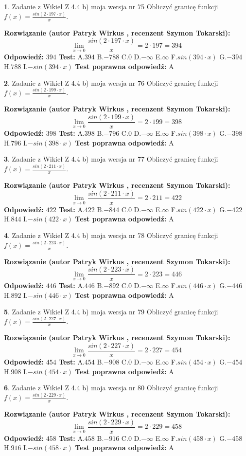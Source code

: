 \documentclass[12pt, a4paper]{article}
\theoremstyle{definition} %
\newtheorem{zad}{}
\newcommand{\zadStart}[1]{\begin{zad}#1\newline}
\newcommand{\zadStop}{\end{zad}}
\newcommand{\rozwStart}[2]{\noindent \textbf{Rozwiązanie (autor #1 , recenzent #2): }\newline}
\newcommand{\rozwStop}{\newline}
\newcommand{\odpStart}{\noindent \textbf{Odpowiedź:}\newline}
\newcommand{\odpStop}{\newline}
\newcommand{\testStart}{\noindent \textbf{Test:}\newline}
\newcommand{\testStop}{\newline}
\newcommand{\kluczStart}{\noindent \textbf{Test poprawna odpowiedź:}\newline}
\newcommand{\kluczStop}{\newline}
\begin{document}
\zadStart{Zadanie z Wikieł Z 4.4 b) moja wersja nr 75}
Obliczyć granicę funkcji $f(x)=\frac{sin(2 \cdot197\cdot x)}{x}$.
\zadStop
\rozwStart{Patryk Wirkus}{Szymon Tokarski}
$$\lim\limits_{x\to 0}\frac{sin(2 \cdot 197\cdot x)}{x}=
2 \cdot 197 = 394$$
\rozwStop
\odpStart
$394$
\odpStop
\testStart
A.$394$
B.$-788$
C.$0$
D.$-\infty$
E.$\infty$
F.$sin(394\cdot x)$
G.$-394$
H.$788$
I.$-sin(394\cdot x)$
\testStop
\kluczStart
A
\kluczStop



\zadStart{Zadanie z Wikieł Z 4.4 b) moja wersja nr 76}
Obliczyć granicę funkcji $f(x)=\frac{sin(2 \cdot199\cdot x)}{x}$.
\zadStop
\rozwStart{Patryk Wirkus}{Szymon Tokarski}
$$\lim\limits_{x\to 0}\frac{sin(2 \cdot 199\cdot x)}{x}=
2 \cdot 199 = 398$$
\rozwStop
\odpStart
$398$
\odpStop
\testStart
A.$398$
B.$-796$
C.$0$
D.$-\infty$
E.$\infty$
F.$sin(398\cdot x)$
G.$-398$
H.$796$
I.$-sin(398\cdot x)$
\testStop
\kluczStart
A
\kluczStop



\zadStart{Zadanie z Wikieł Z 4.4 b) moja wersja nr 77}
Obliczyć granicę funkcji $f(x)=\frac{sin(2 \cdot211\cdot x)}{x}$.
\zadStop
\rozwStart{Patryk Wirkus}{Szymon Tokarski}
$$\lim\limits_{x\to 0}\frac{sin(2 \cdot 211\cdot x)}{x}=
2 \cdot 211 = 422$$
\rozwStop
\odpStart
$422$
\odpStop
\testStart
A.$422$
B.$-844$
C.$0$
D.$-\infty$
E.$\infty$
F.$sin(422\cdot x)$
G.$-422$
H.$844$
I.$-sin(422\cdot x)$
\testStop
\kluczStart
A
\kluczStop



\zadStart{Zadanie z Wikieł Z 4.4 b) moja wersja nr 78}
Obliczyć granicę funkcji $f(x)=\frac{sin(2 \cdot223\cdot x)}{x}$.
\zadStop
\rozwStart{Patryk Wirkus}{Szymon Tokarski}
$$\lim\limits_{x\to 0}\frac{sin(2 \cdot 223\cdot x)}{x}=
2 \cdot 223 = 446$$
\rozwStop
\odpStart
$446$
\odpStop
\testStart
A.$446$
B.$-892$
C.$0$
D.$-\infty$
E.$\infty$
F.$sin(446\cdot x)$
G.$-446$
H.$892$
I.$-sin(446\cdot x)$
\testStop
\kluczStart
A
\kluczStop



\zadStart{Zadanie z Wikieł Z 4.4 b) moja wersja nr 79}
Obliczyć granicę funkcji $f(x)=\frac{sin(2 \cdot227\cdot x)}{x}$.
\zadStop
\rozwStart{Patryk Wirkus}{Szymon Tokarski}
$$\lim\limits_{x\to 0}\frac{sin(2 \cdot 227\cdot x)}{x}=
2 \cdot 227 = 454$$
\rozwStop
\odpStart
$454$
\odpStop
\testStart
A.$454$
B.$-908$
C.$0$
D.$-\infty$
E.$\infty$
F.$sin(454\cdot x)$
G.$-454$
H.$908$
I.$-sin(454\cdot x)$
\testStop
\kluczStart
A
\kluczStop



\zadStart{Zadanie z Wikieł Z 4.4 b) moja wersja nr 80}
Obliczyć granicę funkcji $f(x)=\frac{sin(2 \cdot229\cdot x)}{x}$.
\zadStop
\rozwStart{Patryk Wirkus}{Szymon Tokarski}
$$\lim\limits_{x\to 0}\frac{sin(2 \cdot 229\cdot x)}{x}=
2 \cdot 229 = 458$$
\rozwStop
\odpStart
$458$
\odpStop
\testStart
A.$458$
B.$-916$
C.$0$
D.$-\infty$
E.$\infty$
F.$sin(458\cdot x)$
G.$-458$
H.$916$
I.$-sin(458\cdot x)$
\testStop
\kluczStart
A
\kluczStop
\end{document}

